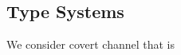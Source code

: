 \documentclass[../DraftNotes.tex]{subfiles}
\begin{document}
\subsection{Type Systems}
We consider covert channel that is
\end{document}
